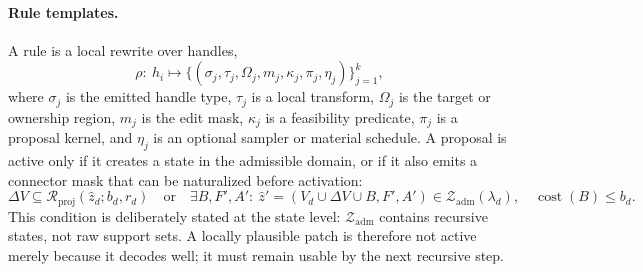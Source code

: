 \paragraph{Rule templates.}
A rule is a local rewrite over handles,
\[
\rho:\ h_i\mapsto
\{(\sigma_j,\tau_j,\Omega_j,m_j,\kappa_j,\pi_j,\eta_j)\}_{j=1}^{k},
\]
where $\sigma_j$ is the emitted handle type, $\tau_j$ is a local transform, $\Omega_j$ is the target or ownership region, $m_j$ is the edit mask, $\kappa_j$ is a feasibility predicate, $\pi_j$ is a proposal kernel, and $\eta_j$ is an optional sampler or material schedule. A proposal is active only if it creates a state in the admissible domain, or if it also emits a connector mask that can be naturalized before activation:
\[
\Delta V\subseteq\mathcal R_{\mathrm{proj}}(\hat z_d;b_d,r_d)
\quad\text{or}\quad
\exists B,F',A':\ 
\hat z'=(V_d\cup\Delta V\cup B,F',A')\in\mathcal Z_{\mathrm{adm}}(\lambda_d),
\quad
\operatorname{cost}(B)\le b_d.
\]
This condition is deliberately stated at the state level: $\mathcal Z_{\mathrm{adm}}$ contains recursive states, not raw support sets. A locally plausible patch is therefore not active merely because it decodes well; it must remain usable by the next recursive step.

